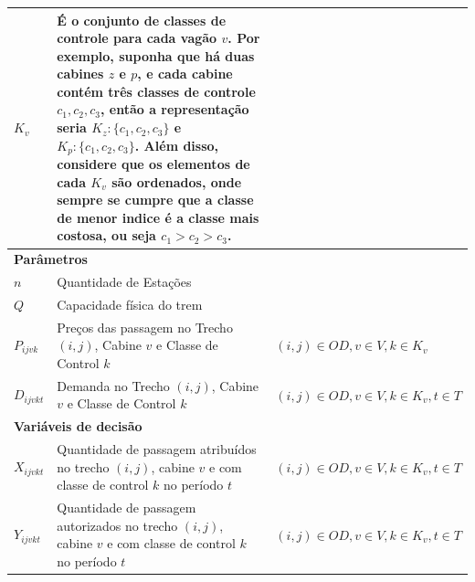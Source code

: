 \begin{table}[H]
\begin{tabular}{p{2cm} p{9.5cm} p{3.2cm}}
		$K_v$              & É o conjunto de classes de controle para cada vagão $v$. Por exemplo, suponha que há duas cabines $z$ e $p$, e cada cabine contém três classes de controle $c_1, c_2, c_3$, então a representação seria $K_z:\{c_1,c_2,c_3\}$ e $K_p:\{c_1,c_2,c_3\}$. Além disso, considere que os elementos de cada $K_v$ são ordenados, onde sempre se cumpre que a classe de menor indice é a classe mais costosa, ou seja $c_1>c_2>c_3$.                                                                                                        &                                              \\ \midrule
		\multicolumn{3}{l}{\textbf{Parâmetros}}                                                                                                                                                                                         \\ \midrule
		$n$                & Quantidade de Estações                                                                                                                                                 &                                              \\
		$Q$                & Capacidade física do trem                                                                                                                                          &                                              \\
		$P_{ijvk}$         & Preços  das passagem no Trecho $(i,j)$, Cabine $v$ e Classe de Control $k$                                                                                  & $(i,j) \in OD,v \in V, k \in K_v$            \\
		$D_{ijvkt}$        & Demanda no Trecho $(i,j)$, Cabine $v$ e Classe de Control $k$                                                                                 & $(i,j) \in OD,v \in V, k \in K_v, t \in T$   \\ \midrule
		\multicolumn{3}{l}{\textbf{Variáveis de decisão}}                                                                                                                                                                               \\ \midrule
		$X_{ijvkt}$        & Quantidade de passagem atribuídos no trecho $(i,j)$, cabine $v$ e com classe de control $k$ no período $t$                                                  & $(i,j) \in OD, v \in V, k \in K_v, t \in T$  \\
		$Y_{ijvkt}$        & Quantidade de passagem autorizados no trecho $(i,j)$, cabine $v$ e com classe de control $k$ no período $t$                                                 & $(i,j) \in OD, v \in V, k \in K_v, t \in T$  \\

\end{tabular}
\end{table}
